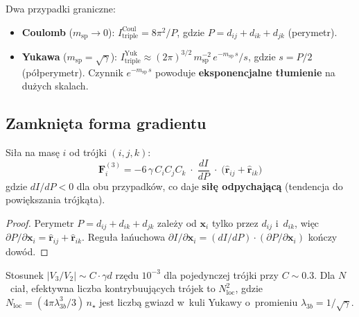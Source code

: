 Dwa przypadki graniczne:
\begin{itemize}[nosep]
  \item \textbf{Coulomb} ($m_{\mathrm{sp}} \to 0$):
    $I_{\mathrm{triple}}^{\mathrm{Coul}} = 8\pi^2/P$,
    gdzie $P = d_{ij} + d_{ik} + d_{jk}$ (perymetr).
  \item \textbf{Yukawa} ($m_{\mathrm{sp}} = \sqrt{\gamma}$):
    $I_{\mathrm{triple}}^{\mathrm{Yuk}} \approx
    (2\pi)^{3/2}\,m_{\mathrm{sp}}^{-2}\,e^{-m_{\mathrm{sp}}\,s}/s$,
    gdzie $s = P/2$ (p\'o\l{}perymetr).
    Czynnik $e^{-m_{\mathrm{sp}}\,s}$ powoduje
    \textbf{eksponencjalne t\l{}umienie} na du\.zych skalach.
\end{itemize}

\subsection{Zamkni\k{e}ta forma gradientu}

\begin{proposition}\label{prop:3body-force-main}
Si\l{}a na mas\k{e} $i$ od tr\'ojki $(i,j,k)$:
\begin{equation}\label{eq:F3-main}
  \boxed{
    \mathbf{F}_i^{(3)} = -6\,\gamma\,C_i C_j C_k
    \;\cdot\; \frac{dI}{dP} \;\cdot\;
    \bigl(\hat{\mathbf{r}}_{ij} + \hat{\mathbf{r}}_{ik}\bigr)
  }
\end{equation}
gdzie $dI/dP < 0$ dla obu przypadk\'ow, co daje
\textbf{si\l{}\k{e} odpychaj\k{a}c\k{a}} (tendencja do
powi\k{e}kszania tr\'ojk\k{a}ta).
\end{proposition}

\begin{proof}
Perymetr $P = d_{ij} + d_{ik} + d_{jk}$ zale\.zy od $\mathbf{x}_i$
tylko przez $d_{ij}$ i~$d_{ik}$, wi\k{e}c
$\partial P/\partial\mathbf{x}_i = \hat{\mathbf{r}}_{ij} +
\hat{\mathbf{r}}_{ik}$.
Regu\l{}a \l{}a\'nuchowa $\partial I/\partial\mathbf{x}_i
= (dI/dP)\cdot(\partial P/\partial\mathbf{x}_i)$ ko\'nczy dow\'od.
\end{proof}

\begin{remark}[Skalowanie]
Stosunek $|V_3/V_2| \sim C \cdot \gamma d$ rz\k{e}du $10^{-3}$
dla pojedynczej tr\'ojki przy $C \sim 0.3$.
Dla $N$~cia\l{}, efektywna liczba kontrybuuj\k{a}cych tr\'ojek
to $N_{\mathrm{loc}}^2$, gdzie $N_{\mathrm{loc}}
= (4\pi\lambda_{3b}^3/3)\,n_\star$ jest liczb\k{a} gwiazd
w~kuli Yukawy o~promieniu $\lambda_{3b} = 1/\sqrt{\gamma}$.
\end{remark}

